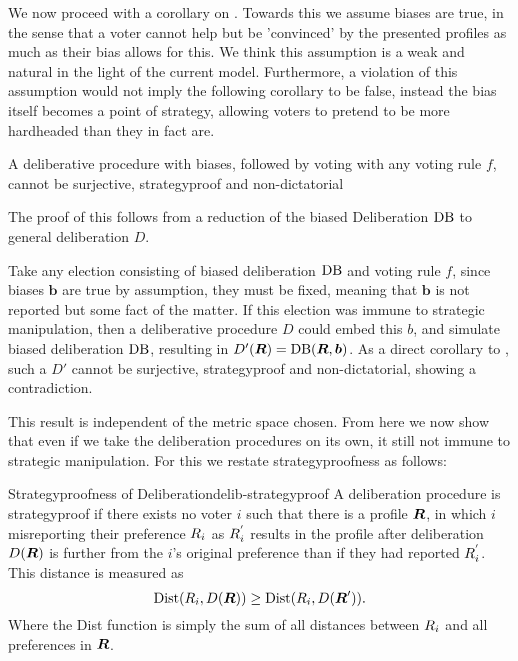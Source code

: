 We now proceed with a corollary on . Towards this we assume biases are true, in the sense that a voter cannot help but be 'convinced' by the presented profiles as much as their bias allows for this. We think this assumption is a weak and natural in the light of the current model. Furthermore, a violation of this assumption would not imply the following corollary to be false, instead the bias itself becomes a point of strategy, allowing voters to pretend to be more hardheaded than they in fact are.

\begin{corollary}
	A deliberative procedure with biases, followed by voting with any voting rule $f$, cannot be surjective, strategyproof and non-dictatorial

	\label{corollary:biased-delib}
\end{corollary}

The proof of this follows from a reduction of the biased Deliberation $\operatorname{DB}$ to general deliberation $D$.

\begin{proofc}{}
	Take any election consisting of biased deliberation $\operatorname{DB}$ and voting rule $f$, since biases $\boldsymbol{b}$ are true by assumption, they must be fixed, meaning that $\boldsymbol{b}$ is not reported but some fact of the matter. If this election was immune to strategic manipulation, then a deliberative procedure $D$ could embed this $b$, and simulate biased deliberation $\operatorname{DB}$, resulting in $D'(\boldsymbol{R}) = \operatorname{DB}(\boldsymbol{R}, \boldsymbol{b})$. As a direct corollary to , such a $D'$ cannot be surjective, strategyproof and non-dictatorial, showing a contradiction.
\end{proofc}

This result is independent of the metric space chosen. From here we now show that even if we take the deliberation procedures on its own, it still not immune to strategic manipulation. For this we restate strategyproofness as follows:

\begin{definition}{Strategyproofness of Deliberation}{delib-strategyproof}
	A deliberation procedure is strategyproof if there exists no voter $i$ such that there is a profile $\boldsymbol{R}$, in which $i$ misreporting their preference $R_{i}$ as $R_{i}^{'}$ results in the profile after deliberation $D(\boldsymbol{R})$ is further from the $i$'s original preference than if they had reported $R_{i}^{'}$. This distance is measured as
	\[\operatorname{Dist}(R_{i}, D(\boldsymbol{R})) \geq \operatorname{Dist}(R_{i}, D(\boldsymbol{R}')).\]
	Where the Dist function is simply the sum of all distances between $R_i$ and all preferences in $\boldsymbol{R}$.
\end{definition}

